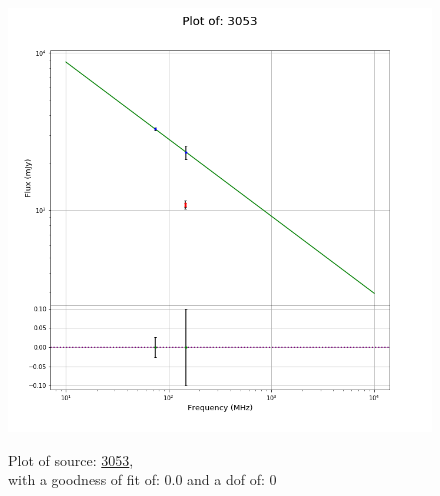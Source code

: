\documentclass{article}
\begin{document}
\begin{figure}[H]
\begin{minipage}{0.5\textwidth}
        \includegraphics[scale = 0.35]{KmeulenSimSource_1hr/1hr3053.png}
        \captionsetup{labelformat=empty}
        \caption{Plot of source: \href{http://banana.transientskp.org/r4/vlo_KmeulenSimSource/runningcatalog/3053}{3053},\\with a goodness of fit of: 0.0 and a dof of: 0}
    \addtocounter{figure}{-1}
    \label{KmeulenSimSource:1hr:3053:plot}
    \end{minipage}
\end{figure}
\end{document}
